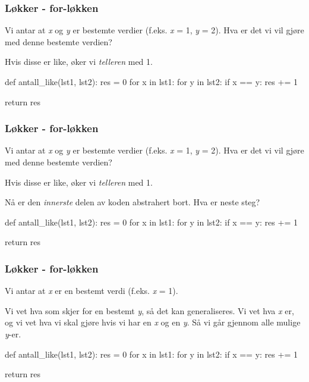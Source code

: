 \begin{frame}[fragile]
    \frametitle{Løkker - for-løkken}

    Vi antar at \textit{x} og \textit{y} er bestemte verdier (f.eks. \textit{x} = 1, \textit{y} = 2). Hva er det vi vil gjøre med denne bestemte verdien? 

    Hvis disse er like, øker vi \textit{telleren} med 1. 

\begin{python}
def antall_like(lst1, lst2):
    res = 0
    for x in lst1: 
        for y in lst2:
            if x == y: 
                res += 1
    
    return res
\end{python}

\end{frame}

\begin{frame}[fragile]
    \frametitle{Løkker - for-løkken}

    Vi antar at \textit{x} og \textit{y} er bestemte verdier (f.eks. \textit{x} = 1, \textit{y} = 2). Hva er det vi vil gjøre med denne bestemte verdien? 

    Hvis disse er like, øker vi \textit{telleren} med 1. 

    Nå er den \textit{innerste} delen av koden abstrahert bort. Hva er neste steg? 

\begin{python}
def antall_like(lst1, lst2):
    res = 0
    for x in lst1: 
        for y in lst2:
            if x == y: 
                res += 1
    
    return res
\end{python}

\end{frame}

\begin{frame}[fragile]
    \frametitle{Løkker - for-løkken}

    Vi antar at \textit{x} er en bestemt verdi (f.eks. \textit{x} = 1). 

    Vi vet hva som skjer for en bestemt \textit{y}, så det kan generaliseres. Vi vet hva \textit{x} er, og vi vet hva vi skal gjøre hvis vi har en \textit{x} og en \textit{y}. Så vi går gjennom alle mulige \textit{y}-er. 

\begin{python}
def antall_like(lst1, lst2):
    res = 0
    for x in lst1: 
        for y in lst2:
            if x == y: 
                res += 1
    
    return res
\end{python}

\end{frame}

